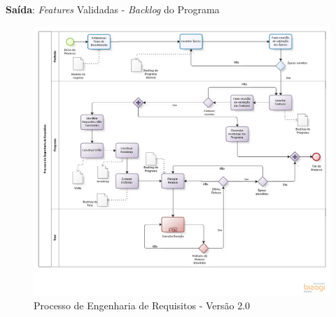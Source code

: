 \textbf{Saída}:  \textit{Features} Validadas - \textit{Backlog} do Programa  \\


\begin{figure}[!htb]
\flushleft
\includegraphics[scale=0.5]{figuras/processo2.png}
\caption{Processo de Engenharia de Requisitos - Versão 2.0}
\label{fig:Processo2}
\end{figure}
